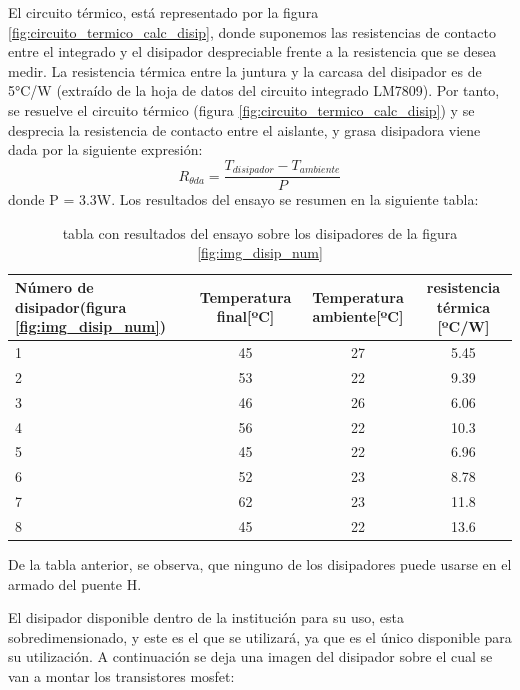 El circuito térmico, está representado por la figura \ref{fig:circuito_termico_calc_disip}, donde suponemos las resistencias de contacto entre el integrado y el disipador despreciable frente a la resistencia que se desea medir. La resistencia térmica entre la juntura y la carcasa del disipador es de 5°C/W (extraído de la hoja de datos del circuito integrado LM7809). Por tanto, se resuelve el circuito térmico (figura \ref{fig:circuito_termico_calc_disip}) y se desprecia la resistencia de contacto entre el aislante, y grasa disipadora viene dada por la siguiente expresión: 
\begin{equation}
	R_{\theta da} = \frac{T_{disipador}- T_{ambiente} }{P}
\end{equation}
donde P = 3.3W. Los resultados del ensayo se resumen en la siguiente tabla: 
\begin{table}[ht!]
	\centering
	\begin{tabular}{|p{3cm}|c|c|c|}
		\hline  
		Número de disipador(figura \ref{fig:img_disip_num}) & Temperatura final[ºC] & Temperatura ambiente[ºC] & resistencia térmica [ºC/W] \\ \hline 
		 1& 45& 27 &5.45 \\ \hline 
		 2& 53& 22 &9.39 \\ \hline 
		 3& 46& 26 &6.06 \\ \hline 
		 4& 56& 22 &10.3 \\ \hline 
		 5& 45& 22 &6.96 \\ \hline 
		 6& 52& 23 &8.78 \\ \hline 
		 7& 62& 23 &11.8 \\ \hline 
		 8& 45& 22 &13.6 \\ \hline 
	\end{tabular}
\caption{tabla con resultados del ensayo sobre los disipadores de la figura \ref{fig:img_disip_num}}
\end{table}

De la tabla anterior, se observa, que ninguno de los disipadores puede usarse en el armado del puente H.  

El disipador disponible dentro de la institución para su uso, esta sobredimensionado, y este es el que se utilizará, ya que es el único disponible para su utilización. A continuación se deja una imagen del disipador sobre el cual se van a montar los transistores mosfet: 


